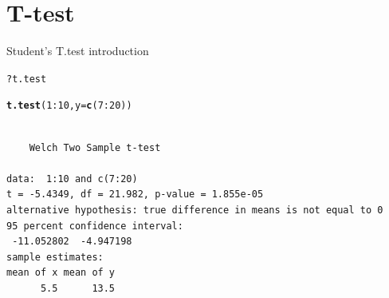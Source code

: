 \documentclass[10pt]{beamer}\usepackage[]{graphicx}\usepackage[]{color}
\makeatletter
\newcommand{\hlnum}[1]{\textcolor[rgb]{0.686,0.059,0.569}{#1}}%
\newcommand{\hlcom}[1]{\textcolor[rgb]{0.678,0.584,0.686}{\textit{#1}}}%
\newcommand{\hlopt}[1]{\textcolor[rgb]{0,0,0}{#1}}%
\newcommand{\hlstd}[1]{\textcolor[rgb]{0.345,0.345,0.345}{#1}}%
\newcommand{\hlkwc}[1]{\textcolor[rgb]{0.333,0.667,0.333}{#1}}%
\newcommand{\hlkwd}[1]{\textcolor[rgb]{0.737,0.353,0.396}{\textbf{#1}}}%
\newenvironment{kframe}{%
 \def\at@end@of@kframe{}%
 \ifinner\ifhmode%
  \def\at@end@of@kframe{\end{minipage}}%
  \begin{minipage}{\columnwidth}%
 \fi\fi%
 \def\FrameCommand##1{\hskip\@totalleftmargin \hskip-\fboxsep
 \colorbox{shadecolor}{##1}\hskip-\fboxsep
     \hskip-\linewidth \hskip-\@totalleftmargin \hskip\columnwidth}%
 \MakeFramed {\advance\hsize-\width
   \@totalleftmargin\z@ \linewidth\hsize
   \@setminipage}}%
 {\par\unskip\endMakeFramed%
 \at@end@of@kframe}
\newenvironment{knitrout}{}{} %
\makeatother
\begin{document}
\section{T-test}

\begin{frame}[fragile]{Student's T.test introduction}%
\begin{knitrout}
\color{fgcolor}\begin{kframe}
\begin{alltt}
\hlopt{?}\hlstd{t.test}
\end{alltt}
\end{kframe}
\end{knitrout}

  \pause
\begin{knitrout}
\color{fgcolor}\begin{kframe}
\begin{alltt}
\hlkwd{t.test}\hlstd{(}\hlnum{1}\hlopt{:}\hlnum{10}\hlstd{,} \hlkwc{y} \hlstd{=} \hlkwd{c}\hlstd{(}\hlnum{7}\hlopt{:}\hlnum{20}\hlstd{))}
\end{alltt}
\begin{verbatim}

	Welch Two Sample t-test

data:  1:10 and c(7:20)
t = -5.4349, df = 21.982, p-value = 1.855e-05
alternative hypothesis: true difference in means is not equal to 0
95 percent confidence interval:
 -11.052802  -4.947198
sample estimates:
mean of x mean of y 
      5.5      13.5 
\end{verbatim}
\end{kframe}
\end{knitrout}

\end{frame}
\end{document}
